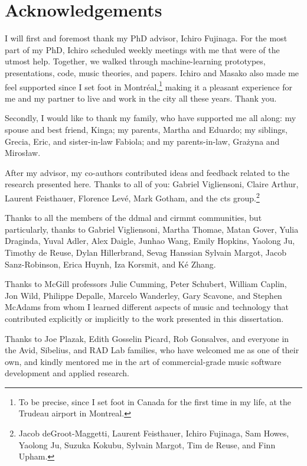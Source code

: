 \chapter*{Acknowledgements}
\label{chap:acknowledgements}

I will first and foremost thank my PhD advisor, Ichiro
Fujinaga. For the most part of my PhD, Ichiro scheduled
weekly meetings with me that were of the utmost help.
Together, we walked through machine-learning prototypes,
presentations, code, music theories, and papers. Ichiro and
Masako also made me feel supported since I set foot in
Montr\'eal,\footnote{To be precise, since I set foot in
Canada for the first time in my life, at the Trudeau airport
in Montreal.} making it a pleasant experience for me and my
partner to live and work in the city all these years. Thank
you.

Secondly, I would like to thank my family, who have
supported me all along: my spouse and best friend, Kinga; my
parents, Martha and Eduardo; my siblings, Grecia, Eric, and
sister-in-law Fabiola; and my parents-in-law, Gra\.zyna and
Miros\l{}aw.

After my advisor, my co-authors contributed ideas and
feedback related to the research presented here. Thanks to
all of you: Gabriel Vigliensoni, Claire Arthur, Laurent
Feisthauer, Florence Lev\'e, Mark Gotham, and the \gls{cts}
group.\footnote{Jacob deGroot-Maggetti, Laurent Feisthauer,
Ichiro Fujinaga, Sam Howes, Yaolong Ju, Suzuka Kokubu,
Sylvain Margot, Tim de Reuse, and Finn Upham.}

Thanks to all the members of the \gls{ddmal} and
\gls{cirmmt} communities, but particularly, thanks to
Gabriel Vigliensoni, Martha Thomae, Matan Gover, Yulia
Draginda, Yuval Adler, Alex Daigle, Junhao Wang, Emily
Hopkins, Yaolong Ju, Timothy de Reuse, Dylan Hillerbrand,
Sevag Hanssian Sylvain Margot, Jacob Sanz-Robinson, Erica
Huynh, Iza Korsmit, and K\'e Zhang.

Thanks to McGill professors Julie Cumming, Peter Schubert,
William Caplin, Jon Wild, Philippe Depalle, Marcelo
Wanderley, Gary Scavone, and Stephen McAdams from whom I
learned different aspects of music and technology that
contributed explicitly or implicitly to the work presented
in this dissertation.

Thanks to Joe Plazak, Edith Gosselin Picard, Rob Gonsalves,
and everyone in the Avid, Sibelius, and RAD Lab families,
who have welcomed me as one of their own, and kindly
mentored me in the art of commercial-grade music software
development and applied research.

